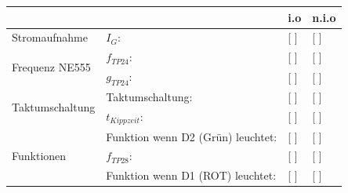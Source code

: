 \renewcommand{\arraystretch}{2}
\begin{tabularx}{\textwidth}{p{}| p{} | p{} | p{}}

 &  & i.o & n.i.o \\

\hline

Stromaufnahme & $I_{G}$: & [ ] & [ ] \\

\hline

\multirow{2}{*}{Frequenz NE555 }
		& $f_{TP24}$: 				& [ ] & [ ] \\
		& $g_{TP24}$:				& [ ] & [ ] \\

\hline

\multirow{2}{*}{Taktumschaltung}
		& Taktumschaltung:				&	[ ] & [ ] 	\\
		& $t_{Kippzeit}$: 				&	[ ]	& [ ] 	\\
	
\hline		
		
\multirow{3}{*}{Funktionen}
		& Funktion wenn D2 (Grün) leuchtet:  			& [ ] & [ ] 	\\
		& $f_{TP28}$: 									& [ ] & [ ] 	\\
		& Funktion wenn D1 (ROT) leuchtet:				& [ ] & [ ] 	\\ 

\end{tabularx}
\renewcommand{\arraystretch}{1}

